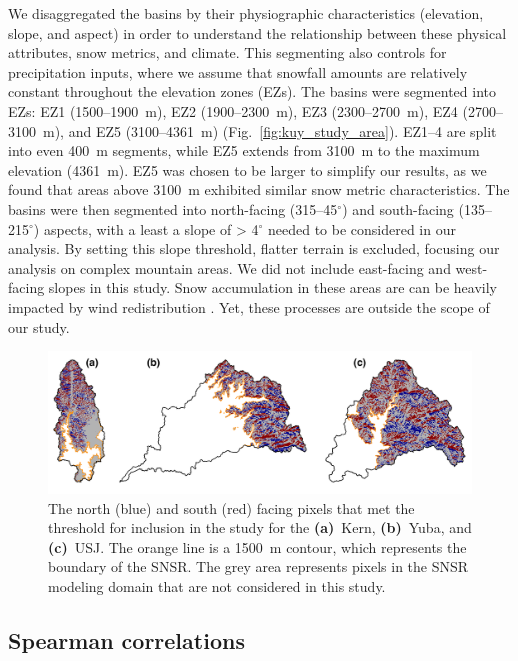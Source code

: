 We disaggregated the basins by their physiographic characteristics (elevation, slope, and aspect) in order to understand the relationship between these physical attributes, snow metrics, and climate. This segmenting also controls for precipitation inputs, where we assume that snowfall amounts are relatively constant throughout the elevation zones (EZs). The basins were segmented into EZs: EZ1 (1500--1900~m), EZ2 (1900--2300~m), EZ3 (2300--2700~m), EZ4 (2700--3100~m), and EZ5 (3100--4361~m) (Fig.~\ref{fig:kuy_study_area}). EZ1--4 are split into even 400~m segments, while EZ5 extends from 3100~m to the maximum elevation (4361~m). EZ5 was chosen to be larger to simplify our results, as we found that areas above 3100~m exhibited similar snow metric characteristics. The basins were then segmented into north-facing (315--45$^{\circ}$) and south-facing (135--215$^{\circ}$) aspects, with a least a slope of > 4$^{\circ}$ needed to be considered in our analysis. By setting this slope threshold, flatter terrain is excluded, focusing our analysis on complex mountain areas. We did not include east-facing and west-facing slopes in this study. Snow accumulation in these areas are can be heavily impacted by wind redistribution \citep{winstralSpatialSnowModeling2002}. Yet, these processes are outside the scope of our study.

\begin{figure}[t]
\centering
\includegraphics[width=\textwidth]{figures/ch2_figs/kuy_snow_metric_area_v2.png}
\caption{The north (blue) and south (red) facing pixels that met the threshold for inclusion in the study for the \textbf{(a)}~Kern, \textbf{(b)}~Yuba, and \textbf{(c)}~USJ. The orange line is a 1500~m contour, which represents the boundary of the SNSR. The grey area represents pixels in the SNSR modeling domain that are not considered in this study.}
\label{fig:kuy_snow_metric_area}
\end{figure}


\hypertarget{ch2-methods-3}{\subsection{Spearman correlations}\label{ch2-methods-3}}

